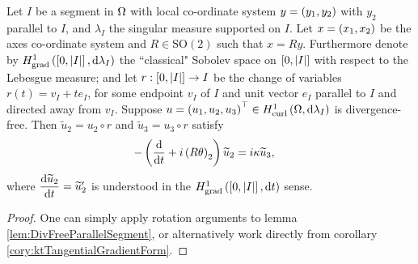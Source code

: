 \begin{prop} \label{prop:DivFreeGeneralSegment}
	Let $I$ be a segment in $\Omega$ with local co-ordinate system $y=\left( y_1,y_2 \right)$ with $y_2$ parallel to $I$, and $\lambda_I$ the singular measure supported on $I$.
	Let $x=\left( x_1,x_2 \right)$ be the axes co-ordinate system and $R\in\mathrm{SO}(2)$ such that $x=Ry$.
	Furthermore denote by $H^1_\mathrm{grad}\left( \left[ 0,\left\lvert I \right\rvert \right], \mathrm{d}\lambda_I \right)$ the ``classical" Sobolev space on $\left[ 0,\left\lvert I \right\rvert \right]$ with respect to the Lebesgue measure; and let $r:\left[ 0,\left\lvert I \right\rvert \right]\rightarrow I$ be the change of variables $r(t)= v_I + t e_I$, for some endpoint $v_I$ of $I$ and unit vector $e_I$ parallel to $I$ and directed away from $v_I$.
	Suppose $u=\left( u_1, u_2, u_3 \right)^\top\in H^1_\mathrm{curl}\left( \Omega, \mathrm{d}\lambda_I \right)$ is divergence-free.
	Then $\widetilde{u}_2 = u_2 \circ r$ and $\widetilde{u}_3 = u_3 \circ r$ satisfy
	\begin{align*}
		-\left( \dfrac{\mathrm{d}}{\mathrm{d}t} + i\left( R\theta \right)_2 \right)\widetilde{u}_2 &= i\kappa\widetilde{u}_3,
	\end{align*}
	where $\dfrac{\mathrm{d}\widetilde{u}_2}{\mathrm{d}t} = \widetilde{u}'_2$ is understood in the $H^1_\mathrm{grad}\left( \left[ 0,\left\lvert I \right\rvert \right], \mathrm{d}t \right)$ sense.
\end{prop}
\begin{proof}
	One can simply apply rotation arguments to lemma \ref{lem:DivFreeParallelSegment}, or alternatively work directly from corollary \ref{cory:ktTangentialGradientForm}.
\end{proof}

